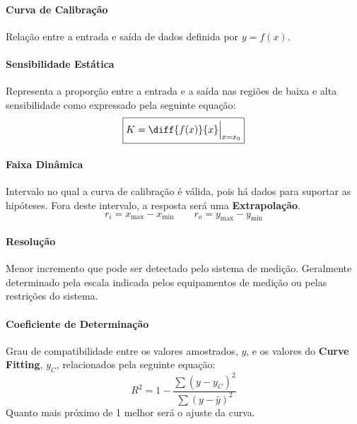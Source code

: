 \documentclass{article}
\begin{document}
            \paragraph{Curva de Calibração}Relação entre a entrada e saída de dados definida por $y = f(x)$.

            \paragraph{Sensibilidade Estática}Representa a proporção entre a entrada e a saída nas regiões de baixa e alta sensibilidade como expressado pela seguinte equação:
                \begin{equation}
                    \boxed{
                        K = \diff{f(x)}{x}\Bigr|_{\substack{x = x_{0}}}
                    }
                \end{equation}

            \paragraph{Faixa Dinâmica}Intervalo no qual a curva de calibração é válida, pois há dados para suportar as hipóteses. Fora deste intervalo, a resposta será uma \textbf{Extrapolação}.
                \begin{equation}
                    \boxed{r_{i} = x_{\text{max}} - x_{\text{min}}}
                    \qquad
                    \boxed{r_{o} = y_{\text{max}} - y_{\text{min}}}
                \end{equation}

            \paragraph{Resolução}Menor incremento que pode ser detectado pelo sistema de medição. Geralmente determinado pela escala indicada pelos equipamentos de medição ou pelas restrições do sistema.

            \paragraph{Coeficiente de Determinação}Grau de compatibilidade entre os valores amostrados, $y$, e os valores do \textbf{Curve Fitting}, $y_{C}$, relacionados pela seguinte equação:
                \begin{equation}
                    \boxed{
                        R^{2} = 1 - \frac{\sum(y - y_{C})^{2}}{\sum(y - \bar{y})^{2}}
                    }
                \end{equation}
            Quanto mais próximo de 1 melhor será o ajuste da curva.
\end{document}
